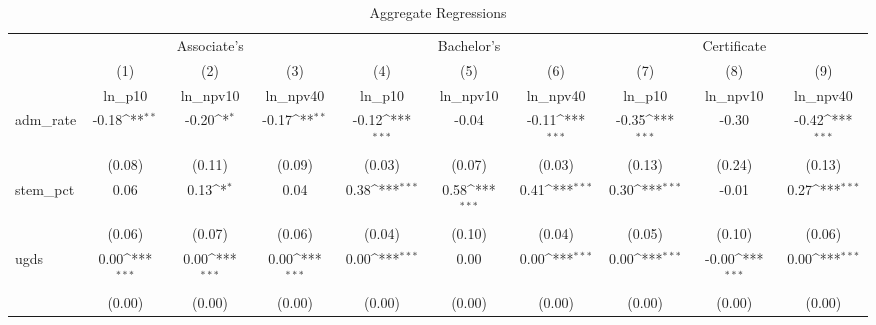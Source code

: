 \begin{table}[htbp]\centering
\def\sym#1{\ifmmode^{#1}\else\(^{#1}\)\fi}
\caption{Aggregate Regressions}
\begin{adjustbox}{center}
\begin{tabular}{l*{9}{c}}
\toprule
                    &\multicolumn{3}{c}{Associate's}                                  &\multicolumn{3}{c}{Bachelor's}                                   &\multicolumn{3}{c}{Certificate}                                  \\\cmidrule(lr){2-4}\cmidrule(lr){5-7}\cmidrule(lr){8-10}
                    &\multicolumn{1}{c}{(1)}&\multicolumn{1}{c}{(2)}&\multicolumn{1}{c}{(3)}&\multicolumn{1}{c}{(4)}&\multicolumn{1}{c}{(5)}&\multicolumn{1}{c}{(6)}&\multicolumn{1}{c}{(7)}&\multicolumn{1}{c}{(8)}&\multicolumn{1}{c}{(9)}\\
                    &\multicolumn{1}{c}{ln\_p10}&\multicolumn{1}{c}{ln\_npv10}&\multicolumn{1}{c}{ln\_npv40}&\multicolumn{1}{c}{ln\_p10}&\multicolumn{1}{c}{ln\_npv10}&\multicolumn{1}{c}{ln\_npv40}&\multicolumn{1}{c}{ln\_p10}&\multicolumn{1}{c}{ln\_npv10}&\multicolumn{1}{c}{ln\_npv40}\\
\midrule
adm\_rate            &       -0.18\sym{**} &       -0.20\sym{*}  &       -0.17\sym{**} &       -0.12\sym{***}&       -0.04         &       -0.11\sym{***}&       -0.35\sym{***}&       -0.30         &       -0.42\sym{***}\\
                    &      (0.08)         &      (0.11)         &      (0.09)         &      (0.03)         &      (0.07)         &      (0.03)         &      (0.13)         &      (0.24)         &      (0.13)         \\
stem\_pct            &        0.06         &        0.13\sym{*}  &        0.04         &        0.38\sym{***}&        0.58\sym{***}&        0.41\sym{***}&        0.30\sym{***}&       -0.01         &        0.27\sym{***}\\
                    &      (0.06)         &      (0.07)         &      (0.06)         &      (0.04)         &      (0.10)         &      (0.04)         &      (0.05)         &      (0.10)         &      (0.06)         \\
ugds                &        0.00\sym{***}&        0.00\sym{***}&        0.00\sym{***}&        0.00\sym{***}&        0.00         &        0.00\sym{***}&        0.00\sym{***}&       -0.00\sym{***}&        0.00\sym{***}\\
                    &      (0.00)         &      (0.00)         &      (0.00)         &      (0.00)         &      (0.00)         &      (0.00)         &      (0.00)         &      (0.00)         &      (0.00)         \\

\end{tabular}
\end{adjustbox}
\end{table}

